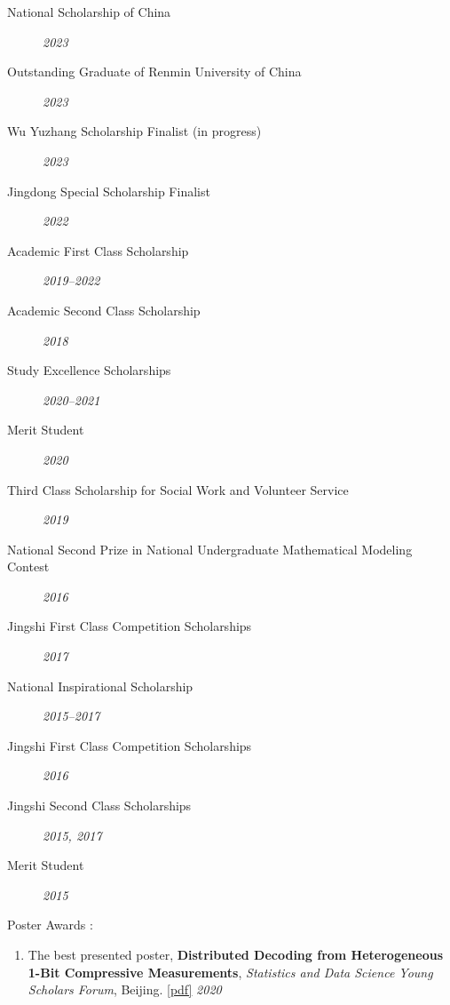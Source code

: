 \documentclass[margin,line]{resume-bib}
\begin{document}
\begin{resume}
\begin{description}
        \item[National Scholarship of China]   
        \hfill \textsl{2023} 
        \item[Outstanding Graduate of Renmin University of China]
        \hfill \textsl{2023} 
        \item[Wu Yuzhang Scholarship Finalist (in progress)]
        \hfill \textsl{2023} 
        \item[Jingdong Special Scholarship Finalist]
        \hfill \textsl{2022} 
        \item[Academic First Class Scholarship]   
        \hfill \textsl{2019--2022} 
        \item[Academic Second Class Scholarship]   
        \hfill \textsl{2018} 
        \item[Study Excellence Scholarships]   
        \hfill \textsl{2020--2021} 
        \item[Merit Student]   
        \hfill \textsl{2020}
        \item[Third Class Scholarship for Social Work and Volunteer Service]   
        \hfill \textsl{2019}%
        \item[National Second Prize in {\small National Undergraduate Mathematical Modeling Contest}]   
        \hfill \textsl{2016} 
        \item[Jingshi First Class Competition Scholarships]   
        \hfill \textsl{2017} 
        \item[National Inspirational Scholarship]   
        \hfill \textsl{2015--2017} 
        \item[Jingshi First Class Competition Scholarships]   
        \hfill \textsl{2016} 
        \item[Jingshi Second Class Scholarships]   
        \hfill \textsl{2015, 2017} 
        \item[Merit Student]   
        \hfill \textsl{2015} 

        \item[Poster Awards $\!:$]  
\end{description}
\begin{enumerate}
    \item The best presented poster, {\textbf{Distributed Decoding from Heterogeneous 1-Bit Compressive Measurements}}, \textsl{Statistics and Data Science Young Scholars Forum}, Beijing. \href{https://canyi-chen.github.io/static/Poster/1bit.pdf}{[pdf]} \hfill \textsl{2020}
\end{enumerate}


\end{resume}
\end{document}

